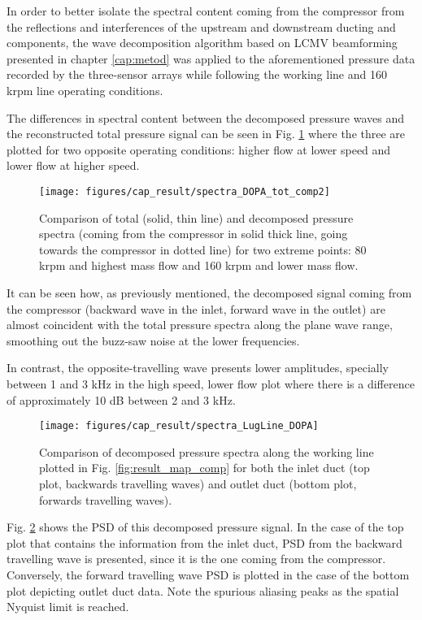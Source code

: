 In order to better isolate the spectral content coming from the compressor from the reflections and interferences of the upstream and downstream ducting and components, the wave decomposition algorithm based on LCMV beamforming presented in chapter \ref{cap:metod} was applied to the aforementioned pressure data recorded by the three-sensor arrays while following the working line and 160 krpm line operating conditions.

The differences in spectral content between the decomposed pressure waves and the reconstructed total pressure signal can be seen in Fig. \ref{fig:result_spectra_DOPA_tot_comp} where the three are plotted for two opposite operating conditions: higher flow at lower speed and lower flow at higher speed.

\begin{figure}[b!]
\centering
\texttt{[image: figures/cap\_result/spectra\_DOPA\_tot\_comp2]}
\caption{Comparison of total (solid, thin line) and decomposed pressure spectra (coming from the compressor in solid thick line, going towards the compressor in dotted line) for two extreme points: 80 krpm and highest mass flow and 160 krpm and lower mass flow.}
\label{fig:result_spectra_DOPA_tot_comp}
\end{figure}

It can be seen how, as previously mentioned, the decomposed signal coming from the compressor (backward wave in the inlet, forward wave in the outlet) are almost coincident with the total pressure spectra along the plane wave range, smoothing out the buzz-saw noise at the lower frequencies. 

In contrast, the opposite-travelling wave presents lower amplitudes, specially between 1 and 3 kHz in the high speed, lower flow plot where there is a difference of approximately 10 dB between 2 and 3 kHz.

\begin{figure}[tbh!]
\centering
\texttt{[image: figures/cap\_result/spectra\_LugLine\_DOPA]}
\caption{Comparison of decomposed pressure spectra along the working line plotted in Fig. \ref{fig:result_map_comp} for both the inlet duct (top plot, backwards travelling waves) and outlet duct (bottom plot, forwards travelling waves).}
\label{fig:result_spectra_LugLine_DOPA}
\end{figure}

Fig. \ref{fig:result_spectra_LugLine_DOPA} shows the PSD of this decomposed pressure signal. In the case of the top plot that contains the information from the inlet duct, PSD from the backward travelling wave is presented, since it is the one coming from the compressor. Conversely, the forward travelling wave PSD is plotted in the case of the bottom plot depicting outlet duct data. Note the spurious aliasing peaks as the spatial Nyquist limit is reached.

